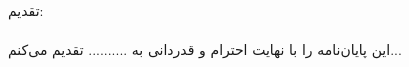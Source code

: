 \huge{تقدیم:}\\
\hfill\\
\large{
 این پایان‌نامه را با نهایت احترام و قدردانی به .......... تقدیم می‌کنم...}